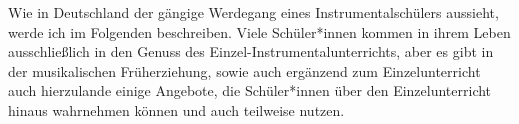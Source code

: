 
Wie in Deutschland der gängige Werdegang eines Instrumentalschülers aussieht,
werde ich im Folgenden beschreiben. Viele Schüler*innen kommen in ihrem Leben
ausschließlich in den Genuss des Einzel-Instrumentalunterrichts, aber es gibt in
der musikalischen Früherziehung, sowie auch ergänzend zum Einzelunterricht auch
hierzulande einige Angebote, die Schüler*innen über den Einzelunterricht hinaus
wahrnehmen können und auch teilweise nutzen.





